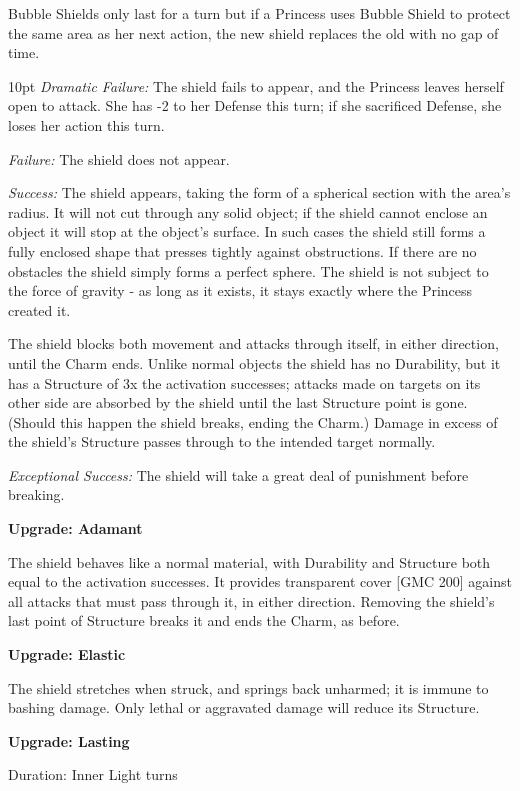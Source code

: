 Bubble Shields only last for a turn but if a Princess uses Bubble Shield to protect the same area as her next action, the new shield replaces the old with no gap of time.

\begin{myindentpar}{10pt}    \emph{Dramatic Failure:} The shield fails to appear, and the Princess leaves herself open to attack. She has -2 to her Defense this turn; if she sacrificed Defense, she loses her action this turn.

\emph{Failure:} The shield does not appear.

\emph{Success:} The shield appears, taking the form of a spherical section with the area’s radius. It will not cut through any solid object; if the shield cannot enclose an object it will stop at the object’s surface. In such cases the shield still forms a fully enclosed shape that presses tightly against obstructions. If there are no obstacles the shield simply forms a perfect sphere. The shield is not subject to the force of gravity - as long as it exists, it stays exactly where the Princess created it.

The shield blocks both movement and attacks through itself, in either direction, until the Charm ends. Unlike normal objects the shield has no Durability, but it has a Structure of 3x the activation successes; attacks made on targets on its other side are absorbed by the shield until the last Structure point is gone. (Should this happen the shield breaks, ending the Charm.) Damage in excess of the shield’s Structure passes through to the intended target normally.

\emph{Exceptional Success:} The shield will take a great deal of punishment before breaking.

\textbf{Upgrade: Adamant}

The shield behaves like a normal material, with Durability and Structure both equal to the activation successes. It provides transparent cover [GMC 200] against all attacks that must pass through it, in either direction. Removing the shield’s last point of Structure breaks it and ends the Charm, as before.

\textbf{Upgrade: Elastic}

The shield stretches when struck, and springs back unharmed; it is immune to bashing damage. Only lethal or aggravated damage will reduce its Structure.

\textbf{Upgrade: Lasting}

\noindent Duration: Inner Light turns


\end{myindentpar}
